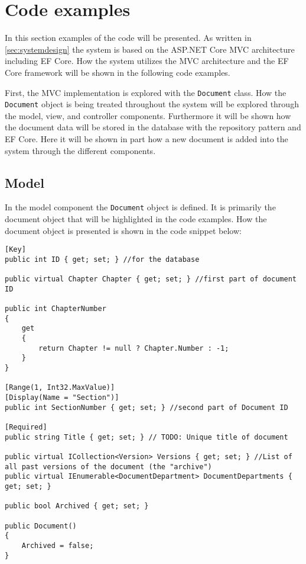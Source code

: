 \section{Code examples}\label{sec:codeexamples}
In this section examples of the code will be presented.
As written in \cref{sec:systemdesign} the system is based on the ASP.NET Core MVC architecture including EF Core.
How the system utilizes the MVC architecture and the EF Core framework will be shown in the following code examples.

First, the MVC implementation is explored with the \texttt{Document} class.
How the \texttt{Document} object is being treated throughout the system will be explored through the model, view, and controller components.
Furthermore it will be shown how the document data will be stored in the database with the repository pattern and EF Core.
Here it will be shown in part how a new document is added into the system through the different components.

\subsection{Model}

In the model component the \texttt{Document} object is defined.
It is primarily the document object that will be highlighted in the code examples.
How the document object is presented is shown in the code snippet below:
\\
\begin{lstlisting}[caption={Document Model: Document object}, label={lst:doc}]
[Key]
public int ID { get; set; } //for the database

public virtual Chapter Chapter { get; set; } //first part of document ID

public int ChapterNumber
{
	get
	{
		return Chapter != null ? Chapter.Number : -1;
	}
}

[Range(1, Int32.MaxValue)]
[Display(Name = "Section")]
public int SectionNumber { get; set; } //second part of Document ID

[Required]
public string Title { get; set; } // TODO: Unique title of document

public virtual ICollection<Version> Versions { get; set; } //List of all past versions of the document (the "archive")
public virtual IEnumerable<DocumentDepartment> DocumentDepartments { get; set; }

public bool Archived { get; set; }

public Document()
{
	Archived = false;
}
\end{lstlisting}

